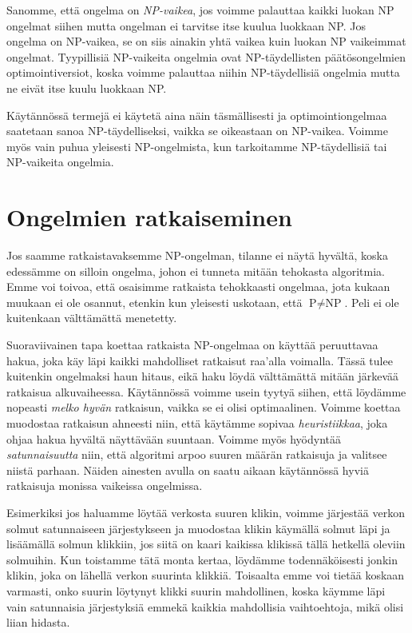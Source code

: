 Sanomme, että ongelma on \emph{NP-vaikea}, jos voimme palauttaa
kaikki luokan NP ongelmat siihen mutta ongelman ei
tarvitse itse kuulua luokkaan NP.
Jos ongelma on NP-vaikea, se on siis ainakin yhtä vaikea
kuin luokan NP vaikeimmat ongelmat.
Tyypillisiä NP-vaikeita ongelmia ovat NP-täydellisten
päätösongelmien optimointiversiot,
koska voimme palauttaa niihin NP-täydellisiä ongelmia
mutta ne eivät itse kuulu luokkaan NP.

Käytännössä termejä ei käytetä aina näin täsmällisesti
ja optimointiongelmaa saatetaan sanoa NP-täydelliseksi,
vaikka se oikeastaan on NP-vaikea.
Voimme myös vain puhua yleisesti NP-ongelmista,
kun tarkoitamme NP-täydellisiä tai NP-vaikeita ongelmia.

\section{Ongelmien ratkaiseminen}

Jos saamme ratkaistavaksemme NP-ongelman,
tilanne ei näytä hy\-vältä, koska edessämme on silloin ongelma,
johon ei tunneta mitään tehokasta algoritmia.
Emme voi toivoa, että osaisimme ratkaista tehokkaasti ongelmaa,
jota kukaan muukaan ei ole osannut,
etenkin kun yleisesti uskotaan, että $\textrm{P} \neq \textrm{NP}$.
Peli ei ole kuitenkaan välttämättä menetetty.

Suoraviivainen tapa koettaa ratkaista NP-ongelmaa on 
käyttää peruuttavaa hakua, joka käy läpi kaikki mahdolliset
ratkaisut raa'alla voimalla.
Tässä tulee kuitenkin ongelmaksi haun hitaus,
eikä haku löydä välttämättä mitään järkevää ratkaisua alkuvaiheessa.
Käytännössä voimme usein tyytyä siihen,
että löydämme nopeasti \emph{melko hyvän} ratkaisun,
vaikka se ei olisi optimaalinen.
Voimme koettaa muodostaa ratkaisun ahneesti niin,
että käytämme sopivaa \emph{heuristiikkaa},
joka ohjaa hakua hyvältä näyttävään suuntaan.
Voimme myös hyödyntää \emph{satunnaisuutta} niin,
että algoritmi arpoo suuren määrän ratkaisuja
ja valitsee niistä parhaan.
Näiden ainesten avulla on saatu aikaan käytännössä
hyviä ratkaisuja monissa vaikeissa ongelmissa.

Esimerkiksi jos haluamme löytää verkosta suuren klikin,
voimme järjestää verkon solmut satunnaiseen järjestykseen
ja muodostaa klikin käymällä solmut läpi ja lisäämällä
solmun klikkiin, jos siitä on kaari kaikissa klikissä
tällä hetkellä oleviin solmuihin.
Kun toistamme tätä monta kertaa, löydämme todennäköisesti
jonkin klikin, joka on lähellä verkon suurinta klikkiä.
Toisaalta emme voi tietää koskaan varmasti,
onko suurin löytynyt klikki suurin mahdollinen,
koska käymme läpi vain satunnaisia järjestyksiä emmekä
kaikkia mahdollisia vaihtoehtoja, mikä olisi liian hidasta.

